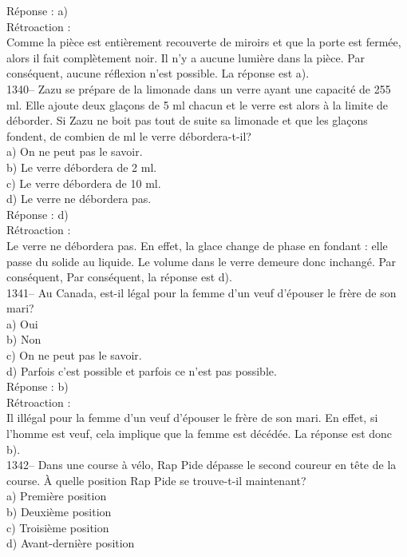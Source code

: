 ﻿\documentclass[letterpaper, 12pt]{article}
\begin{document}
R\'eponse : a)\\

R\'etroaction : \\
Comme la pi\`ece est enti\`erement recouverte de miroirs et que la porte est
ferm\'ee, alors il fait compl\`etement noir.  Il n'y a aucune lumi\`ere dans
la pi\`ece.  Par cons\'equent, aucune r\'eflexion n'est possible.  La
r\'eponse est a).\\

1340-- Zazu se pr\'epare de la limonade dans un verre ayant une capacit\'e
de 255 ml.  Elle ajoute deux gla\c cons de 5 ml chacun et le verre est alors
\`a la limite de d\'eborder.  Si Zazu ne boit pas tout de suite sa limonade
et que les gla\c cons fondent, de combien de ml le verre d\'ebordera-t-il?\\
a) On ne peut pas le savoir.\\
b) Le verre d\'ebordera de 2 ml.\\
c) Le verre d\'ebordera de 10 ml.\\
d) Le verre ne d\'ebordera pas.\\

R\'eponse : d)\\

R\'etroaction : \\
Le verre ne d\'ebordera pas.  En effet, la glace change de phase en fondant
: elle passe du solide au liquide.  Le volume dans le verre demeure donc
inchang\'e.  Par cons\'equent, Par cons\'equent, la r\'eponse est d).\\

1341-- Au Canada, est-il l\'egal pour la femme d'un veuf d'\'epouser le
fr\`ere de son mari?\\
a) Oui\\
b) Non\\
c) On ne peut pas le savoir.\\
d) Parfois c'est possible et parfois ce n'est pas possible.\\

R\'eponse : b)\\

R\'etroaction : \\
Il ill\'egal pour la femme d'un veuf d'\'epouser le fr\`ere de son mari. En
effet, si l'homme est veuf, cela implique que la femme est d\'ec\'ed\'ee.
La r\'eponse est donc b).\\

1342-- Dans une course \`a v\'elo, Rap Pide d\'epasse le second coureur en
t\^ete de la course.  \`A quelle position Rap Pide se trouve-t-il
maintenant?\\
a) Premi\`ere position\\
b) Deuxi\`eme position\\
c) Troisi\`eme position\\
d) Avant-derni\`ere position\\
\end{document}
